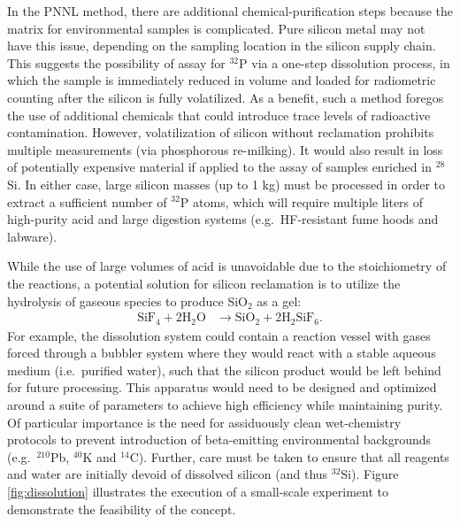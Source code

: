 \documentclass[final,5p]{elsarticle}
\def\si{$^{32}$Si\xspace}
\def\p{$^{32}$P\xspace}
\def\esi{$^{28}$Si\xspace}
\begin{document}
In the PNNL method, there are additional chemical-purification steps because the matrix for environmental samples is complicated. Pure silicon metal may not have this issue, depending on the sampling location in the silicon supply chain. This suggests the possibility of assay for \p via a one-step dissolution process, in which the sample is immediately reduced in volume and loaded for radiometric counting after the silicon is fully volatilized. As a benefit, such a method foregos the use of additional chemicals that could introduce trace levels of radioactive contamination. However, volatilization of silicon without reclamation prohibits multiple measurements (via phosphorous re-milking).  It would also result in loss of potentially expensive material if applied to the assay of samples enriched in \esi. In either case, large silicon masses (up to 1 kg) must be processed in order to extract a sufficient number of \p atoms, which will require multiple liters of high-purity acid and large digestion systems (e.g.\ HF-resistant fume hoods and labware).

While the use of large volumes of acid is unavoidable due to the stoichiometry of the reactions, a potential solution for silicon reclamation is to utilize the hydrolysis of gaseous  species to produce SiO$_2$ as a gel:
\begin{align}
\textrm{SiF}_{4} + 2\textrm{H}_{2}\textrm{O} & \rightarrow  \textrm{SiO}_{2} + 2\textrm{H}_{2}\textrm{SiF}_{6}.
\label{eq:4}
\end{align}
For example, the dissolution system could contain a reaction vessel with gases forced through a bubbler system where they would react with a stable aqueous medium (i.e.\ purified water), such that the silicon product would be left behind for future processing. This apparatus would need to be designed and optimized around a suite of parameters to achieve high efficiency while maintaining purity.  Of particular importance is the need for assiduously clean wet-chemistry protocols to prevent introduction of beta-emitting environmental backgrounds (e.g.\ $^{210}$Pb, $^{40}$K and $^{14}$C). Further, care must be taken to ensure that all reagents and water are initially devoid of dissolved silicon (and thus \si). Figure \ref{fig:dissolution} illustrates the execution of a small-scale experiment to demonstrate the feasibility of the concept.
\end{document}
